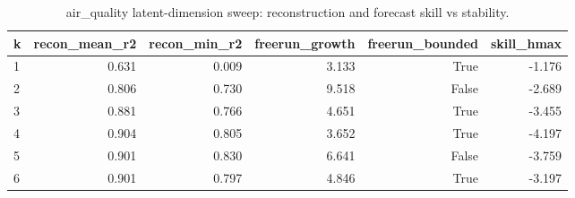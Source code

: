 \begin{table}[t]
\centering
\caption{air_quality latent-dimension sweep: reconstruction and forecast skill vs stability.}
\label{tab:air_quality_ksweep}
\begin{tabular}{lrrrrr}
\toprule
k & recon\_mean\_r2 & recon\_min\_r2 & freerun\_growth & freerun\_bounded & skill\_hmax \\
\midrule
1 & 0.631 & 0.009 & 3.133 & True & -1.176 \\
2 & 0.806 & 0.730 & 9.518 & False & -2.689 \\
3 & 0.881 & 0.766 & 4.651 & True & -3.455 \\
4 & 0.904 & 0.805 & 3.652 & True & -4.197 \\
5 & 0.901 & 0.830 & 6.641 & False & -3.759 \\
6 & 0.901 & 0.797 & 4.846 & True & -3.197 \\
\bottomrule
\end{tabular}
\end{table}